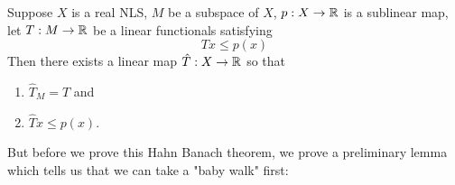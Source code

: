 \begin{theorem}
    Suppose $X$ is a real NLS, $M$ be a subspace of $X$, $p : X \to \mathbb R$ is a sublinear map, let $T: M \to \mathbb R$ be a linear functionals satisfying 
    \begin{equation*}
	Tx \le p(x)
    \end{equation*}
    Then there exists a linear map $\hat{T} : X \to \mathbb R$ so that
\begin{enumerate}
    \item $\hat{T}_{M} = T$ and
    \item $\hat{T} x \le p(x)$.
\end{enumerate}
\label{thm:HBT-real}
\end{theorem}

But before we prove this Hahn Banach theorem, we prove a preliminary lemma which tells us that we can take a "baby walk" first:

